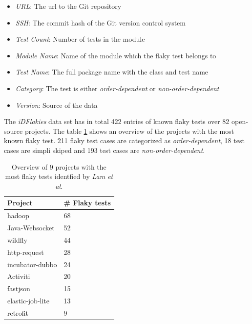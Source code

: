 \documentclass{seal_thesis}
\begin{document}
\begin{itemize}
\item \textit{URL}: The url to the Git repository
\item \textit{SSH}: The commit hash of the Git version control system
\item \textit{Test Count}: Number of tests in the module
\item \textit{Module Name}: Name of the module which the flaky test belongs to
\item \textit{Test Name}: The full package name with the class and test name
\item \textit{Category}: The test is either \textit{order-dependent} or \textit{non-order-dependent}
\item \textit{Version}: Source of the data
\end{itemize}

\noindent The \textit{iDFlakies} data set has in total 422 entries of known flaky tests over 82 open-source projects. The table \ref{tab:idflakies} shows an overview of the projects with the most known flaky test. 211 flaky test cases are categorized as \textit{order-dependent}, 18 test cases are simpli skiped and 193 test cases are \textit{non-order-dependent}.



\begin{table}[ht]
\centering
\begin{tabular}{|l|l|}
\hline
\textbf{Project} & \textbf{\# Flaky tests} \\ \hline
hadoop & 68 \\ \hline
Java-Websocket & 52 \\ \hline
wildfly & 44 \\ \hline
http-request & 28 \\ \hline
incubator-dubbo & 24 \\ \hline
Activiti & 20 \\ \hline
fastjson & 15 \\ \hline
elastic-job-lite & 13 \\ \hline
retrofit & 9 \\ \hline
\end{tabular}
\caption{Overview of 9 projects with the most flaky tests identfied by \textit{Lam et al.} \cite{lam19}}
\label{tab:idflakies}
\end{table}
\end{document}
